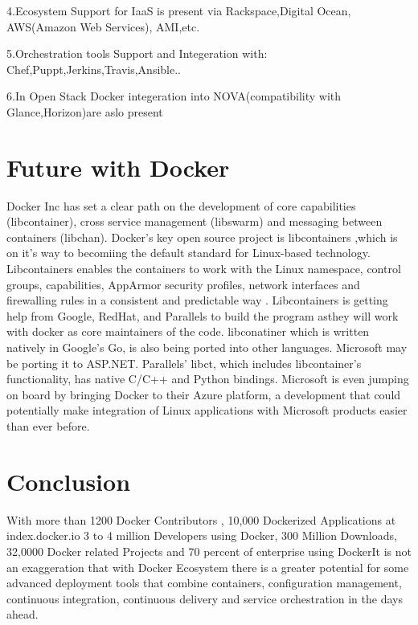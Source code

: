 \documentclass[9pt,twocolumn,twoside]{styles/osajnl}
\begin{document}
4.Ecosystem Support for IaaS is present via Rackspace,Digital Ocean,
AWS(Amazon Web Services), AMI,etc.

5.Orchestration tools Support and Integeration with:
Chef,Puppt,Jerkins,Travis,Ansible..

6.In Open Stack Docker integeration into NOVA(compatibility with
Glance,Horizon)are aslo present

\section{Future with Docker}

Docker Inc has set a clear path on the development of core
capabilities (libcontainer), cross service management (libswarm) and
messaging between containers (libchan). Docker's key open source
project is libcontainers ,which is on it's way to becomiing the
default standard for Linux-based technology.  Libcontainers enables
the containers to work with the Linux namespace, control groups,
capabilities, AppArmor security profiles, network interfaces and
firewalling rules in a consistent and predictable way .
\cite{www-docker-1}Libcontainers is getting help from Google, RedHat,
and Parallels to build the program asthey will work with docker as
core maintainers of the code.  libconatiner which is written natively
in Google's Go, is also being ported into other languages. Microsoft
may be porting it to ASP.NET.  Parallels' libct, which includes
libcontainer's functionality, has native C/C++ and Python
bindings. Microsoft is even jumping on board by bringing Docker to
their Azure platform, a development that could potentially make
integration of Linux applications with Microsoft products easier than
ever before.



\section{Conclusion}

\cite{www-slides-1}With more than 1200 Docker Contributors , 10,000 Dockerized
Applications at index.docker.io 3 to 4 million Developers using
Docker, 300 Million Downloads, 32,0000 Docker related Projects and 70
percent of enterprise using DockerIt is not an exaggeration that with
Docker Ecosystem there is a greater potential for some advanced
deployment tools that combine containers, configuration management,
continuous integration, continuous delivery and service orchestration
in the days ahead.



\end{document}
